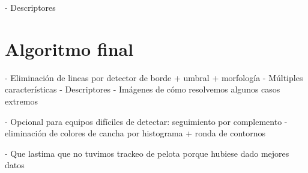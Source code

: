 - Descriptores

\section{Algoritmo final}
\label{sec:alg-final}

- Eliminación de lineas por detector de borde + umbral + morfología
- Múltiples características
- Descriptores
- Imágenes de cómo resolvemos algunos casos extremos

- Opcional para equipos difíciles de detectar: seguimiento por complemento
  - eliminación de colores de cancha por histograma + ronda de contornos

- Que lastima que no tuvimos trackeo de pelota porque hubiese dado mejores datos

